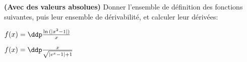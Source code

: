 
\begin{exercice}  \;
\textbf{(Avec des valeurs absolues)} Donner l'ensemble de d\'efinition des fonctions suivantes, puis leur ensemble de d\'erivabilit\'e, et calculer leur d\'eriv\'ees:\\
\begin{enumerate}
\begin{minipage}[t]{0.4\textwidth}
\item $f(x)=\ddp\frac{\ln{(|x^2-1|)}}{x}$
\end{minipage}
\begin{minipage}[t]{0.4\textwidth}
\item $f(x)=\ddp\frac{x}{\sqrt{|e^x-1|+1}}$
\end{minipage}
\end{enumerate}
\end{exercice}